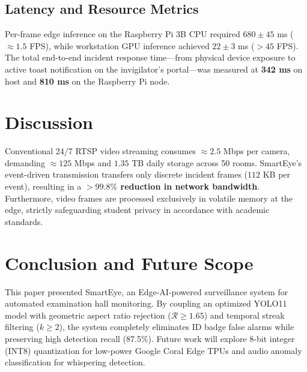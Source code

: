 \documentclass[conference]{IEEEtran}
\begin{document}
\subsection{Latency and Resource Metrics}
Per-frame edge inference on the Raspberry Pi 3B CPU required $680 \pm 45$ ms ($\approx 1.5$ FPS), while workstation GPU inference achieved $22 \pm 3$ ms ($> 45$ FPS). The total end-to-end incident response time—from physical device exposure to active toast notification on the invigilator's portal—was measured at \textbf{342 ms} on host and \textbf{810 ms} on the Raspberry Pi node.

\section{Discussion}
Conventional 24/7 RTSP video streaming consumes $\approx 2.5$ Mbps per camera, demanding $\approx 125$ Mbps and $1.35$ TB daily storage across 50 rooms. SmartEye's event-driven transmission transfers only discrete incident frames ($112$ KB per event), resulting in a \textbf{$> 99.8\%$ reduction in network bandwidth}. Furthermore, video frames are processed exclusively in volatile memory at the edge, strictly safeguarding student privacy in accordance with academic standards.

\section{Conclusion and Future Scope}
This paper presented SmartEye, an Edge-AI-powered surveillance system for automated examination hall monitoring. By coupling an optimized YOLO11 model with geometric aspect ratio rejection ($\mathcal{R} \ge 1.65$) and temporal streak filtering ($k \ge 2$), the system completely eliminates ID badge false alarms while preserving high detection recall (87.5\%). Future work will explore 8-bit integer (INT8) quantization for low-power Google Coral Edge TPUs and audio anomaly classification for whispering detection.
\end{document}
